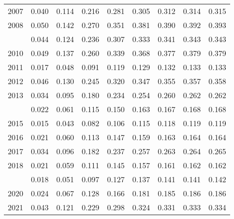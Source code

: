 \documentclass[
]{article}
\begin{document}
\begin{longtable}[t]{lrrrrrrrr}
2007 & 0.040 & 0.114 & 0.216 & 0.281 & 0.305 & 0.312 & 0.314 & 0.315\\
2008 & 0.050 & 0.142 & 0.270 & 0.351 & 0.381 & 0.390 & 0.392 & 0.393\\
\addlinespace
2009 & 0.044 & 0.124 & 0.236 & 0.307 & 0.333 & 0.341 & 0.343 & 0.343\\
2010 & 0.049 & 0.137 & 0.260 & 0.339 & 0.368 & 0.377 & 0.379 & 0.379\\
2011 & 0.017 & 0.048 & 0.091 & 0.119 & 0.129 & 0.132 & 0.133 & 0.133\\
2012 & 0.046 & 0.130 & 0.245 & 0.320 & 0.347 & 0.355 & 0.357 & 0.358\\
2013 & 0.034 & 0.095 & 0.180 & 0.234 & 0.254 & 0.260 & 0.262 & 0.262\\
\addlinespace
2014 & 0.022 & 0.061 & 0.115 & 0.150 & 0.163 & 0.167 & 0.168 & 0.168\\
2015 & 0.015 & 0.043 & 0.082 & 0.106 & 0.115 & 0.118 & 0.119 & 0.119\\
2016 & 0.021 & 0.060 & 0.113 & 0.147 & 0.159 & 0.163 & 0.164 & 0.164\\
2017 & 0.034 & 0.096 & 0.182 & 0.237 & 0.257 & 0.263 & 0.264 & 0.265\\
2018 & 0.021 & 0.059 & 0.111 & 0.145 & 0.157 & 0.161 & 0.162 & 0.162\\
\addlinespace
2019 & 0.018 & 0.051 & 0.097 & 0.127 & 0.137 & 0.141 & 0.141 & 0.142\\
2020 & 0.024 & 0.067 & 0.128 & 0.166 & 0.181 & 0.185 & 0.186 & 0.186\\
2021 & 0.043 & 0.121 & 0.229 & 0.298 & 0.324 & 0.331 & 0.333 & 0.334\\*
\end{longtable}
\end{document}
